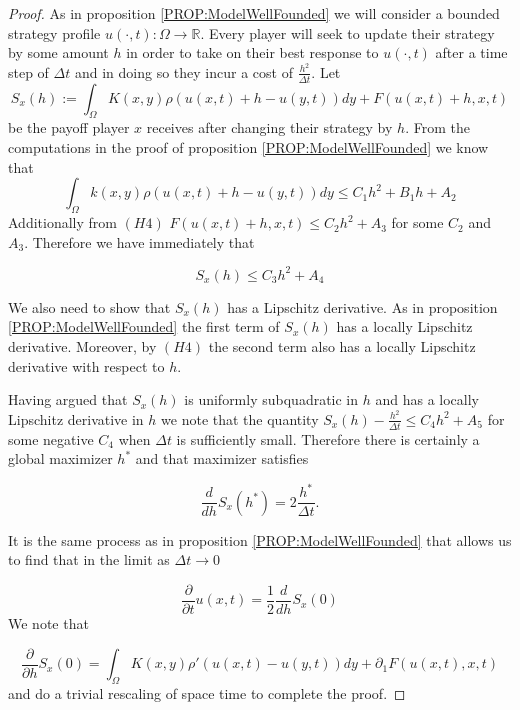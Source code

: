 \documentclass[aps,
preprint,
groupedaddress,
showkeys,
amsmath]{revtex4-2}
\begin{document}
    \begin{proof}
        As in proposition \ref{PROP:ModelWellFounded} we will consider a bounded strategy profile $u(\cdot, t):\Omega\to \mathbb{R}$. Every player will seek to update their strategy by some amount $h$ in order to take on their best response to $u(\cdot, t)$ after a time step of $\Delta t$ and in doing so they incur a cost of $\frac{h^2}{\Delta t}$. Let
        \begin{equation*}
            S_x(h):=\int_\Omega K(x,y)\rho(u(x,t)+h-u(y,t))dy+F(u(x,t)+h,x,t)
        \end{equation*}
        be the payoff player $x$ receives after changing their strategy by $h$. From the computations in the proof of proposition \ref{PROP:ModelWellFounded} we know that 
        \begin{equation*}
            \int_\Omega k(x,y)\rho(u(x,t)+h-u(y,t))dy\leq C_1h^2+B_1h+A_2
        \end{equation*}
        Additionally from $(H4)$ $F(u(x,t)+h,x,t)\leq {C}_2h^2+ A_3$ for some ${C}_2$ and ${A}_3.$ Therefore we have immediately that 
        
       \[S_x(h)\leq C_3h^2+A_4\] 

        We also need to show that $S_x(h)$ has a Lipschitz derivative. As in proposition \ref{PROP:ModelWellFounded} the first term of $S_x(h)$ has a locally Lipschitz derivative. Moreover, by $(H4)$ the second term also has a locally Lipschitz derivative with respect to $h$. 

        Having argued that $S_x(h)$ is uniformly subquadratic in $h$ and has a locally Lipschitz derivative in $h$ we note that the quantity $S_x(h)-\frac{h^2}{\Delta t}\leq C_4h^2+A_5$ for some negative $C_4$ when $\Delta t$ is sufficiently small. Therefore there is certainly a global maximizer $h^*$ and that maximizer satisfies 

       \[\frac{d}{dh}S_x(h^*)=2\frac{h^*}{\Delta t}.\]


        It is the same process as in proposition \ref{PROP:ModelWellFounded} that allows us to find that in the limit as $\Delta t\to 0$
        
       \[\frac{\partial}{\partial t}u(x,t)=\frac{1}{2}\frac{d}{dh}S_x(0)\]
        We note that
        
       \[\frac{\partial}{\partial h}S_x(0)=\int_\Omega K(x,y)\rho'(u(x,t)-u(y,t))dy+\partial_1F(u(x,t),x,t)\] 
       and do a trivial rescaling of space time to complete the proof.  
    \end{proof}
\end{document}

